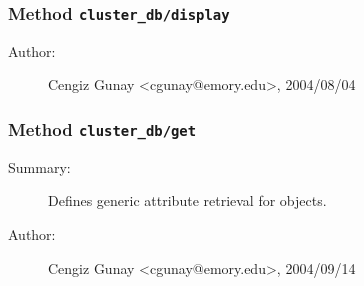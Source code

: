 \subsubsection[Method \texttt{display}]{Method \texttt{cluster\_db/display}}%
%
\label{ref_cluster_db__display}%
\hypertarget{ref_cluster_db__display}{}%
\begin{description}
%
%
%
%
%
%
%
\item[Author:]%
Cengiz Gunay <cgunay@emory.edu>, 2004/08/04%
\end{description}
\methodline%
\subsubsection[Method \texttt{get}]{Method \texttt{cluster\_db/get}}%
%
\label{ref_cluster_db__get}%
\hypertarget{ref_cluster_db__get}{}%
\begin{description}
\item[Summary:]Defines generic attribute retrieval for objects.
%
%
%
%
%
%
%
\item[Author:]%
Cengiz Gunay <cgunay@emory.edu>, 2004/09/14%
\end{description}
\methodline%
